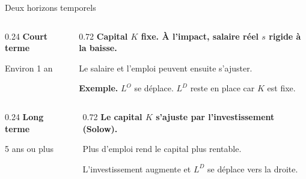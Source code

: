 \documentclass[aspectratio=169]{beamer}
\begin{document}
\begin{frame}{Deux horizons temporels}\examtag

   \begin{tcolorbox}[horizon, colback=HECcoral!6, colframe=HECcoral!6]
      \begin{columns}[c,onlytextwidth]
         \begin{column}{0.24\textwidth}
            \RaggedRight
            \textbf{\textcolor{HECcoral}{Court terme}}\par\vspace{4pt}
            {\footnotesize Environ 1 an}
         \end{column}
         \begin{column}{0.72\textwidth}
            \RaggedRight\small{}
            \textbf{Capital \(K\) fixe. À l'impact, salaire réel \(s\) rigide à la baisse.}\par\smallskip
            Le salaire et l'emploi peuvent ensuite s'ajuster.\par
            \textbf{Exemple.} \(L^{O}\) se déplace. \(L^{D}\) reste en place car \(K\) est fixe.
         \end{column}
      \end{columns}
   \end{tcolorbox}
   \vspace{0.22cm}
   \begin{tcolorbox}[horizon, colback=HECnavy!5, colframe=HECnavy!5]
      \begin{columns}[c,onlytextwidth]
         \begin{column}{0.24\textwidth}
            \RaggedRight
            \textbf{\textcolor{HECnavy}{Long terme}}\par\vspace{4pt}
            {\footnotesize 5 ans ou plus}
         \end{column}
         \begin{column}{0.72\textwidth}
            \RaggedRight\small{}
            \textbf{Le capital \(K\) s'ajuste par l'investissement (Solow).}\par\smallskip
            Plus d'emploi rend le capital plus rentable.\par
            L'investissement augmente et \(L^{D}\) se déplace vers la droite.
         \end{column}
      \end{columns}
   \end{tcolorbox}
\end{frame}
\end{document}
